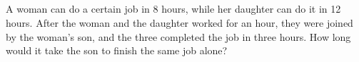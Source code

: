 \subsection{} A woman can do a certain job in 8 hours, while her daughter can do it in 12 hours. After
	the woman and the daughter worked for an hour, they were joined by the woman's son, and the three
	completed the job in three hours. How long would it take the son to finish the same job alone?
